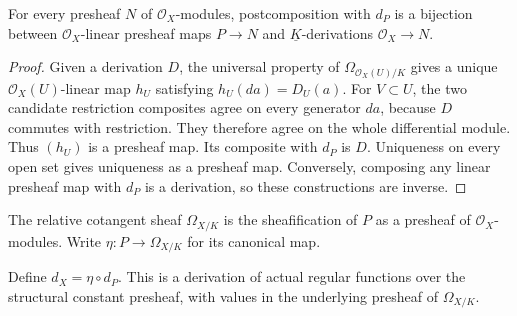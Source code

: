 \begin{theorem}
\label{sc0-canonical-port:geom:cotangent-presheaf-universal}
\leanok
For every presheaf \(N\) of \(\mathcal O_X\)-modules,
postcomposition with \(d_P\) is a bijection between
\(\mathcal O_X\)-linear presheaf maps \(P\to N\) and
\(\underline K\)-derivations \(\mathcal O_X\to N\).
\end{theorem}
\begin{proof}
Given a derivation \(D\), the universal property of
\(\Omega_{\mathcal O_X(U)/K}\) gives a unique
\(\mathcal O_X(U)\)-linear map \(h_U\) satisfying
\(h_U(da)=D_U(a)\). For \(V\subset U\), the two candidate
restriction composites agree on every generator \(da\), because
\(D\) commutes with restriction. They therefore agree on the whole
differential module. Thus \((h_U)\) is a presheaf map.
Its composite with \(d_P\) is \(D\). Uniqueness on every open
set gives uniqueness as a presheaf map. Conversely, composing any
linear presheaf map with \(d_P\) is a derivation, so these
constructions are inverse.
\end{proof}

\begin{definition}
\label{sc0-canonical-port:geom:cotangent-sheaf}
\leanok
The relative cotangent sheaf \(\Omega_{X/K}\) is the
sheafification of \(P\) as a presheaf of
\(\mathcal O_X\)-modules. Write
\(\eta:P\to\Omega_{X/K}\) for its canonical map.
\end{definition}

\begin{definition}
\label{sc0-canonical-port:geom:cotangent-sheaf-derivation}
\leanok
Define \(d_X=\eta\circ d_P\). This is a derivation of actual
regular functions over the structural constant presheaf, with
values in the underlying presheaf of \(\Omega_{X/K}\).
\end{definition}

